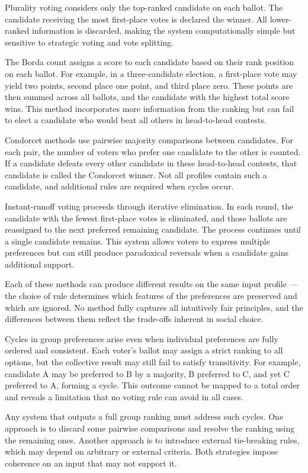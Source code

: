 Plurality voting considers only the top-ranked candidate on each ballot. The candidate receiving the most first-place votes is declared the winner. All lower-ranked information is discarded, making the system computationally simple but sensitive to strategic voting and vote splitting.

The Borda count assigns a score to each candidate based on their rank position on each ballot. For example, in a three-candidate election, a first-place vote may yield two points, second place one point, and third place zero. These points are then summed across all ballots, and the candidate with the highest total score wins. This method incorporates more information from the ranking but can fail to elect a candidate who would beat all others in head-to-head contests.

Condorcet methods use pairwise majority comparisons between candidates. For each pair, the number of voters who prefer one candidate to the other is counted. If a candidate defeats every other candidate in these head-to-head contests, that candidate is called the Condorcet winner. Not all profiles contain such a candidate, and additional rules are required when cycles occur.

Instant-runoff voting proceeds through iterative elimination. In each round, the candidate with the fewest first-place votes is eliminated, and those ballots are reassigned to the next preferred remaining candidate. The process continues until a single candidate remains. This system allows voters to express multiple preferences but can still produce paradoxical reversals when a candidate gains additional support.

Each of these methods can produce different results on the same input profile — the choice of rule determines which features of the preferences are preserved and which are ignored. No method fully captures all intuitively fair principles, and the differences between them reflect the trade-offs inherent in social choice.

Cycles in group preferences arise even when individual preferences are fully ordered and consistent. Each voter's ballot may assign a strict ranking to all options, but the collective result may still fail to satisfy transitivity. For example, candidate A may be preferred to B by a majority, B preferred to C, and yet C preferred to A, forming a cycle. This outcome cannot be mapped to a total order and reveals a limitation that no voting rule can avoid in all cases.

Any system that outputs a full group ranking must address such cycles. One approach is to discard some pairwise comparisons and resolve the ranking using the remaining ones. Another approach is to introduce external tie-breaking rules, which may depend on arbitrary or external criteria. Both strategies impose coherence on an input that may not support it.

